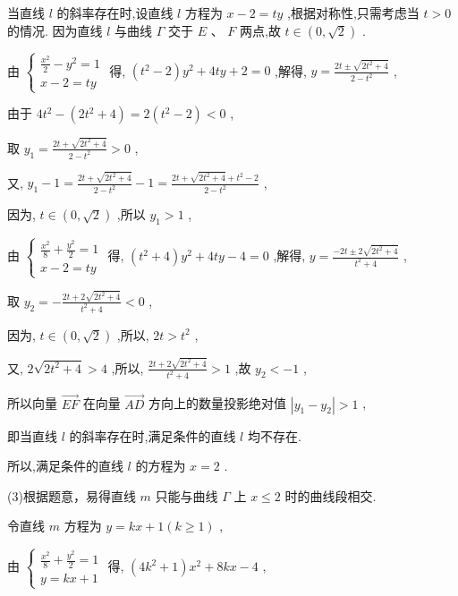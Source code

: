 \documentclass[10pt]{article}
\newcommand*\circled[1]{\tikz[baseline=(char.base)]{\node[shape=circle,draw,inner sep=1.5pt] (char) {\small #1};}}
\begin{document}
 \circled{2} 当直线 \(l\) 的斜率存在时,设直线 \(l\) 方程为 \(x - 2 = {ty}\) ,根据对称性,只需考虑当 \(t > 0\) 的情况. 因为直线 \(l\) 与曲线 \(\Gamma\) 交于 \(E\text{ 、 }F\) 两点,故 \(t \in  \left( {0,\sqrt{2}}\right)\) .

由 \(\left\{  \begin{matrix} \frac{{x}^{2}}{2} - {y}^{2} = 1 \\  x - 2 = {ty} \end{matrix}\right.\) 得, \(\left( {{t}^{2} - 2}\right) {y}^{2} + {4ty} + 2 = 0\) ,解得, \(y = \frac{{2t} \pm  \sqrt{2{t}^{2} + 4}}{2 - {t}^{2}}\) ,

由于 \(4{t}^{2} - \left( {2{t}^{2} + 4}\right)  = 2\left( {{t}^{2} - 2}\right)  < 0\) ,

取 \({y}_{1} = \frac{{2t} + \sqrt{2{t}^{2} + 4}}{2 - {t}^{2}} > 0\) ,

又, \({y}_{1} - 1 = \frac{{2t} + \sqrt{2{t}^{2} + 4}}{2 - {t}^{2}} - 1 = \frac{{2t} + \sqrt{2{t}^{2} + 4} + {t}^{2} - 2}{2 - {t}^{2}}\) ,

因为, \(t \in  \left( {0,\sqrt{2}}\right)\) ,所以 \({y}_{1} > 1\) ,

由 \(\left\{  \begin{matrix} \frac{{x}^{2}}{8} + \frac{{y}^{2}}{2} = 1 \\  x - 2 = {ty} \end{matrix}\right.\) 得, \(\left( {{t}^{2} + 4}\right) {y}^{2} + {4ty} - 4 = 0\) ,解得, \(y = \frac{-{2t} \pm  2\sqrt{2{t}^{2} + 4}}{{t}^{2} + 4}\) ,

取 \({y}_{2} =  - \frac{{2t} + 2\sqrt{2{t}^{2} + 4}}{{t}^{2} + 4} < 0\) ,

因为, \(t \in  \left( {0,\sqrt{2}}\right)\) ,所以, \({2t} > {t}^{2}\) ,

又, \(2\sqrt{2{t}^{2} + 4} > 4\) ,所以, \(\frac{{2t} + 2\sqrt{2{t}^{2} + 4}}{{t}^{2} + 4} > 1\) ,故 \({y}_{2} <  - 1\) ,

所以向量 \(\overrightarrow{EF}\) 在向量 \(\overrightarrow{AD}\) 方向上的数量投影绝对值 \(\left| {{y}_{1} - {y}_{2}}\right|  > 1\) ,

即当直线 \(l\) 的斜率存在时,满足条件的直线 \(l\) 均不存在.

所以,满足条件的直线 \(l\) 的方程为 \(x = 2\) .

(3)根据题意，易得直线 \(m\) 只能与曲线 \(\Gamma\) 上 \(x \leq  2\) 时的曲线段相交.

令直线 \(m\) 方程为 \(y = {kx} + 1\left( {k \geq  1}\right)\) ,

由 \(\left\{  \begin{matrix} \frac{{x}^{2}}{8} + \frac{{y}^{2}}{2} = 1 \\  y = {kx} + 1 \end{matrix}\right.\) 得, \(\left( {4{k}^{2} + 1}\right) {x}^{2} + {8kx} - 4\) ,
\end{document}
